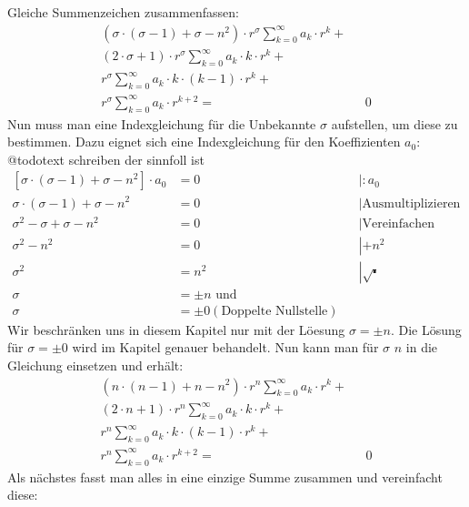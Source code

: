 \begin{refsection}
Gleiche Summenzeichen zusammenfassen:
\begin{align*}
	\left(
	\sigma \cdot \left( \sigma - 1 \right)
	+
	\sigma
	-
	n^2
	\right)
	\cdot r^{\sigma}
	\sum_{k=0}^{\infty} a_k \cdot r^k
	+ \\
	\left(	
	2 \cdot \sigma
	+
	1
	\right)
	\cdot r^{\sigma}
	\sum_{k=0}^{\infty} a_k \cdot k \cdot r^k
	+ \\
	r^{\sigma}
	\sum_{k=0}^{\infty} a_k \cdot k \cdot \left( k - 1 \right) \cdot r^k
	+ \\
	r^{\sigma}
	\sum_{k=0}^{\infty} a_k \cdot r^{k + 2}
	= & \text{ } 0
\end{align*}
Nun muss man eine Indexgleichung für die Unbekannte $\sigma$ aufstellen, um diese zu bestimmen.
Dazu eignet sich eine Indexgleichung f\"ur den Koeffizienten $a_0$:
@todo{text schreiben der sinnfoll ist}
\begin{align*}
	\left[ \sigma \cdot \left( \sigma -1 \right) + \sigma - n^2 \right] \cdot a_0 &= 0 && \left| :a_0 \right. \\
	\sigma \cdot \left( \sigma -1 \right) + \sigma - n^2 &= 0 && \left| \text{Ausmultiplizieren} \right. \\
	\sigma ^2 - \sigma + \sigma -n^2 &= 0 && \left| \text{Vereinfachen} \right.\\
	\sigma ^2 - n^2 &= 0 && \left| +n^2 \right.\\
	\sigma ^2 &= n^2 && \left| \sqrt{\centerdot} \right. \\
	\sigma &= \pm n \text{ und } \\
	\sigma &= \pm 0 \left( \text{Doppelte Nullstelle} \right)
\end{align*}
Wir beschr\"anken uns in diesem Kapitel nur mit der L\"oesung $\sigma = \pm n$. Die L\"osung f\"ur $\sigma = \pm 0$ wird im Kapitel  genauer behandelt.
Nun kann man f\"ur $\sigma$ $n$ in die Gleichung einsetzen und erh\"alt:
\begin{align*}
	\left(
	n \cdot \left( n - 1 \right)
	+
	n
	-
	n^2
	\right)
	\cdot r^{n}
	\sum_{k=0}^{\infty} a_k \cdot r^k
	+ \\
	\left(	
	2 \cdot n
	+
	1
	\right)
	\cdot r^{n}
	\sum_{k=0}^{\infty} a_k \cdot k \cdot r^k
	+ \\
	r^{n}
	\sum_{k=0}^{\infty} a_k \cdot k \cdot \left( k - 1 \right) \cdot r^k
	+ \\
	r^{n}
	\sum_{k=0}^{\infty} a_k \cdot r^{k + 2}
	= & \text{ } 0
\end{align*}
Als n\"achstes fasst man alles in eine einzige Summe zusammen und vereinfacht diese:

\end{refsection}
